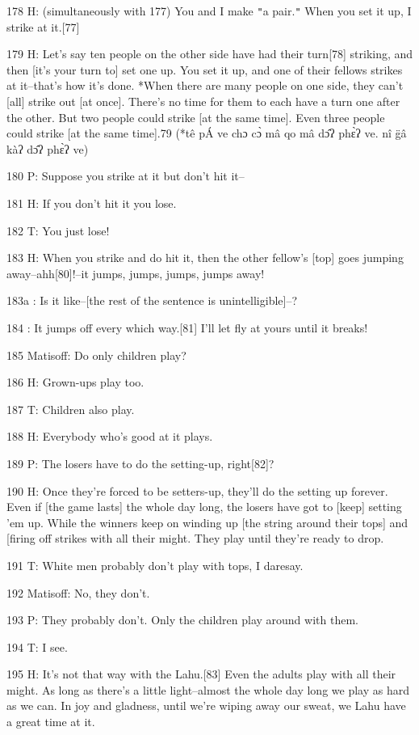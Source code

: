 178 H: (simultaneously with 177) You and I make \texttt{"}a pair.\texttt{"} When
you set it up, I strike at it.[77]

179 H: Let's say ten people on the other side have had their turn[78] striking,
and then [it's your turn to] set one up. You set it up, and one of their fellows
strikes at it--that's how it's done. *When there are many people on one side, they
can't [all] strike out [at once]. There's no time for them to each have a turn
one after the other. But two people could strike [at the same time]. Even three
people could strike [at the same time].79 (*tê pÁ ve chɔ cɔ̀ mâ qo mâ dɔ̂ʔ
phɛ̀ʔ ve. nî g̈â kàʔ dɔ̂ʔ phɛ̀ʔ ve)

180 P: Suppose you strike at it but don't hit it--

181 H: If you don't hit it you lose.

182 T: You just lose!

183 H: When you strike and do hit it, then the other fellow's [top] goes jumping
away--ahh[80]!--it jumps, jumps, jumps, jumps away!

183a  : Is it like--[the rest of the sentence is unintelligible]--?

184    : It jumps off every which way.[81] I'll let fly at yours until it breaks!

185 Matisoff: Do only children play?

186 H: Grown-ups play too.

187 T: Children also play.

188 H: Everybody who's good at it plays.

189 P: The losers have to do the setting-up, right[82]?

190 H: Once they're forced to be setters-up, they'll do the setting up forever.
Even if [the game lasts] the whole day long, the losers have got to [keep] setting
'em up. While the winners keep on winding up [the string around their tops] and
[firing off strikes with all their might. They play until they're ready to drop.

191 T: White men probably don't play with tops, I daresay.

192 Matisoff: No, they don't.

193 P: They probably don't. Only the children play around with them.

194 T: I see.

195 H: It's not that way with the Lahu.[83] Even the adults play with all their
might. As long as there's a little light--almost the whole day long we play as
hard as we can. In joy and gladness, until we're wiping away our sweat, we Lahu
have a great time at it.

